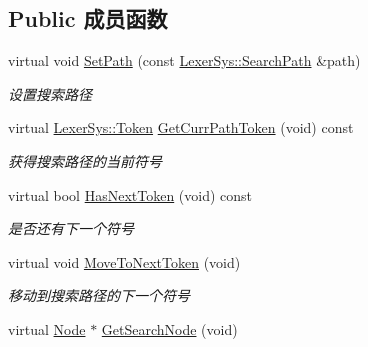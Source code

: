 \subsection*{Public 成员函数}
\begin{DoxyCompactItemize}
\item 
virtual void \hyperlink{class_file_sys_1_1_node_visitor_ac493ab442e116be15f0af8559d63e0e0}{Set\-Path} (const \hyperlink{class_lexer_sys_1_1_search_path}{Lexer\-Sys\-::\-Search\-Path} \&path)
\begin{DoxyCompactList}\small\item\em 设置搜索路径 \end{DoxyCompactList}\item 
virtual \hyperlink{class_lexer_sys_1_1_token}{Lexer\-Sys\-::\-Token} \hyperlink{class_file_sys_1_1_node_visitor_a2cfda47a2803438cb97b0e8b83dbdb79}{Get\-Curr\-Path\-Token} (void) const 
\begin{DoxyCompactList}\small\item\em 获得搜索路径的当前符号 \end{DoxyCompactList}\item 
\hypertarget{class_file_sys_1_1_node_visitor_add992fdbc0bad4e4bdc25025ce8e8a58}{virtual bool \hyperlink{class_file_sys_1_1_node_visitor_add992fdbc0bad4e4bdc25025ce8e8a58}{Has\-Next\-Token} (void) const }\label{class_file_sys_1_1_node_visitor_add992fdbc0bad4e4bdc25025ce8e8a58}

\begin{DoxyCompactList}\small\item\em 是否还有下一个符号 \end{DoxyCompactList}\item 
\hypertarget{class_file_sys_1_1_node_visitor_a2438bc4ed66436f340f02357461c2836}{virtual void \hyperlink{class_file_sys_1_1_node_visitor_a2438bc4ed66436f340f02357461c2836}{Move\-To\-Next\-Token} (void)}\label{class_file_sys_1_1_node_visitor_a2438bc4ed66436f340f02357461c2836}

\begin{DoxyCompactList}\small\item\em 移动到搜索路径的下一个符号 \end{DoxyCompactList}\item 
\hypertarget{class_file_sys_1_1_node_visitor_acb8de479df2e49b6b68ebe2aa1727d71}{virtual \hyperlink{class_file_sys_1_1_node}{Node} $\ast$ \hyperlink{class_file_sys_1_1_node_visitor_acb8de479df2e49b6b68ebe2aa1727d71}{Get\-Search\-Node} (void)}\label{class_file_sys_1_1_node_visitor_acb8de479df2e49b6b68ebe2aa1727d71}


\end{DoxyCompactItemize}
